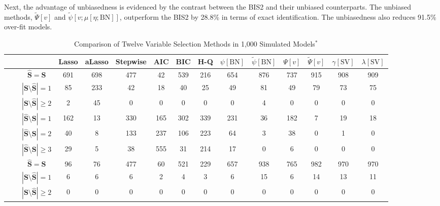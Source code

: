 \documentclass[a4paper,12pt]{article}
\begin{document}
Next, the advantage of unbiasedness is evidenced by the contrast between the BIS2 and their unbiased counterparts. 
The unbiased methods, $\tilde \Psi[v]$ and $\tilde \psi[v;\mu[\eta; \mathrm{BN}]]$, outperform the BIS2 by 28.8\% in terms of exact identification.
The unbiasedness also reduces 91.5\% over-fit models.


\begin{sidewaystable}
\caption{Comparison of Twelve Variable Selection Methods in 1,000 Simulated Models$^*$}
\label{tb:compareselectionmethods}
\centering
{ \small
\begin{tabular}{cc||c||c|c|c|c|c|c|c|c|c|c|c|c} \hline \hline
&&&Lasso&aLasso&Stepwise&AIC&BIC&H-Q&$\psi[\mathrm{BN}]$&$\tilde\psi[\mathrm{BN}]$&$\Psi[v]$&$\tilde\Psi[v]$&$\gamma[\mathrm{SV}]$&$\lambda[\mathrm{SV}]$\\ \hline \hline
\parbox[t]{2mm}{} & \parbox[t]{2mm}{}
& $\hat{\mathbf{S}}=\mathbf{S}$			         &691&698&477&42 &539&216&654&876&737&915&908&909\\  
&&$|\mathbf{S}\setminus\hat{\mathbf{S}}|=1$	     &85 &233&42 &18 &40 &25 &49 &81 &49 &79 &73 &75 \\
&&$|\mathbf{S}\setminus\hat{\mathbf{S}}|\ge 2$	 &2  & 45&0  &0  &0  &0  &0  &4  &0  &0  &0  &0  \\
&&$|\hat{\mathbf{S}}\setminus \mathbf{S}|=1$     &162&13 &330&165&302&339&231&36 &182&7  &19 &18  \\
&&$|\hat{\mathbf{S}}\setminus \mathbf{S}|=2$     &40 &8  &133&237&106&223&64 &3  &38 &0  &1  &0  \\
&&$|\hat{\mathbf{S}}\setminus \mathbf{S}|\ge 3$	 &29 &5  &38 &555&31 &214&17 &0  &6  &0  &0  &0  \\ \hline
\parbox[t]{2mm}{} & \parbox[t]{2mm}{}
& $\hat{\mathbf{S}}=\mathbf{S}$              	 &96 &76 &477&60 &521&229&657&938&765&982&970&970  \\ 
&&$|\mathbf{S}\setminus\hat{\mathbf{S}}|=1$		 &6  &6  &6  &2  &4  &3  &6  &15 &6  &14 &13 &11  \\
&&$|\mathbf{S}\setminus\hat{\mathbf{S}}|\ge 2$   &0  &0  &0  &0  &0  &0  &0  &0  &0  &0	 &0  &0  \\ 

\end{tabular}}
\end{sidewaystable}
\end{document}

